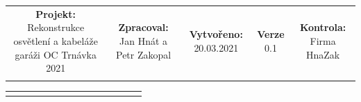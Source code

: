 \documentclass[a4paper, twoside, 11pt]{article}
\begin{document}
	\begin{table}[H]
\resizebox{1 \textwidth}{!}
		{
		\begin{tabular}{!{\vrule width 2pt} c | c | c | c | c !{\vrule width 2pt}}
		\textbf{Projekt:} Rekonstrukce osvětlení a kabeláže garáži OC Trnávka 2021 & \textbf{Zpracoval:} Jan Hnát a Petr Zakopal & \textbf{Vytvořeno: }20.03.2021 & \textbf{Verze} 0.1 & \textbf{Kontrola:} Firma HnaZak\\
		
		\end{tabular}
		}
		\resizebox{1 \textwidth}{!}
		{
		
		\begin{tabular}{ !{\vrule width 2pt} c !{\vrule width 2pt} p{2cm} | p{2cm} | p{2cm} | p{2cm} | c | p{2cm} | p{2cm} | p{2cm} | p{2cm} | c | p{2cm} | p{2cm} | c !{\vrule width 2pt}  }
		

\end{tabular}}
\end{table}
\end{document}
